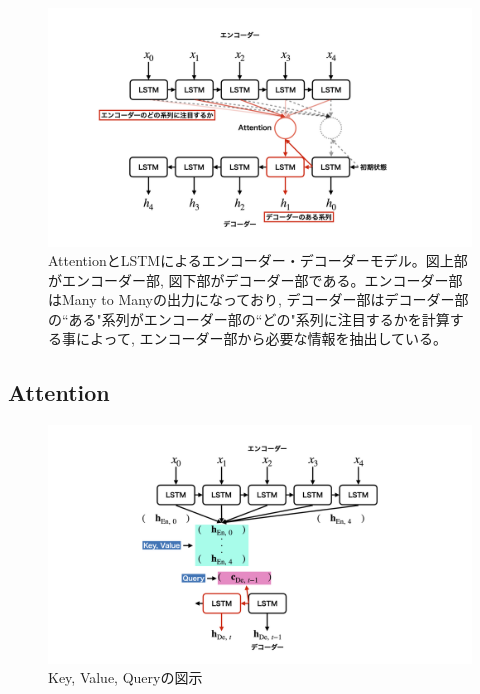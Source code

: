 \begin{figure}[htbp]
 \centering
 \includegraphics[trim = 100 0 100 0, width=1.0\textwidth, clip]{Figure/2DeepLearning/19EncoderDecoderAttention.png}
 \caption[AttentionとLSTMによるエンコーダー・デコーダーモデル]{AttentionとLSTMによるエンコーダー・デコーダーモデル。図上部がエンコーダー部, 図下部がデコーダー部である。エンコーダー部はMany to Manyの出力になっており, デコーダー部はデコーダー部の``ある"系列がエンコーダー部の``どの"系列に注目するかを計算する事によって, エンコーダー部から必要な情報を抽出している。}
 \label{19EncoderDecoderAttention}
\end{figure}


\subsection{Attention} \label{DL:Atten:Attention}

\begin{figure}[htbp]
 \centering
 \includegraphics[trim = 100 0 100 0, width=1.0\textwidth, clip]{Figure/2DeepLearning/19KeyValueQuery.png}
 \caption{Key, Value, Queryの図示}
 \label{19KeyValueQuery}
\end{figure}

